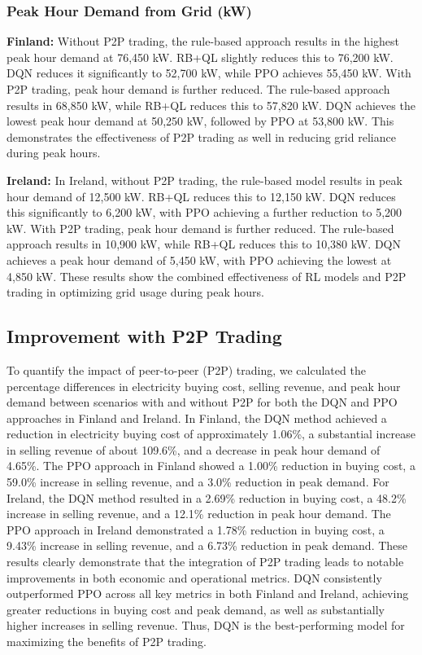 \documentclass[preprint,12pt]{elsarticle}
\begin{document}
\subsubsection{Peak Hour Demand from Grid (kW)}

\textbf{Finland:}  
Without P2P trading, the rule-based approach results in the highest peak hour demand at 76,450 kW. RB+QL slightly reduces this to 76,200 kW. DQN reduces it significantly to 52,700 kW, while PPO achieves 55,450 kW.  
With P2P trading, peak hour demand is further reduced. The rule-based approach results in 68,850 kW, while RB+QL reduces this to 57,820 kW. DQN achieves the lowest peak hour demand at 50,250 kW, followed by PPO at 53,800 kW. This demonstrates the effectiveness of P2P trading as well in reducing grid reliance during peak hours.

\textbf{Ireland:}  
In Ireland, without P2P trading, the rule-based model results in peak hour demand of 12,500 kW. RB+QL reduces this to 12,150 kW. DQN reduces this significantly to 6,200 kW, with PPO achieving a further reduction to 5,200 kW.  
With P2P trading, peak hour demand is further reduced. The rule-based approach results in 10,900 kW, while RB+QL reduces this to 10,380 kW. DQN achieves a peak hour demand of 5,450 kW, with PPO achieving the lowest at 4,850 kW. These results show the combined effectiveness of RL models and P2P trading in optimizing grid usage during peak hours.

\subsection{Improvement with P2P Trading}

To quantify the impact of peer-to-peer (P2P) trading, we calculated the percentage differences in electricity buying cost, selling revenue, and peak hour demand between scenarios with and without P2P for both the DQN and PPO approaches in Finland and Ireland. In Finland, the DQN method achieved a reduction in electricity buying cost of approximately 1.06\%, a substantial increase in selling revenue of about 109.6\%, and a decrease in peak hour demand of 4.65\%. The PPO approach in Finland showed a 1.00\% reduction in buying cost, a 59.0\% increase in selling revenue, and a 3.0\% reduction in peak demand. For Ireland, the DQN method resulted in a 2.69\% reduction in buying cost, a 48.2\% increase in selling revenue, and a 12.1\% reduction in peak hour demand. The PPO approach in Ireland demonstrated a 1.78\% reduction in buying cost, a 9.43\% increase in selling revenue, and a 6.73\% reduction in peak demand. These results clearly demonstrate that the integration of P2P trading leads to notable improvements in both economic and operational metrics. DQN consistently outperformed PPO across all key metrics in both Finland and Ireland, achieving greater reductions in buying cost and peak demand, as well as substantially higher increases in selling revenue. Thus, DQN is the best-performing model for maximizing the benefits of P2P trading.
\end{document}
